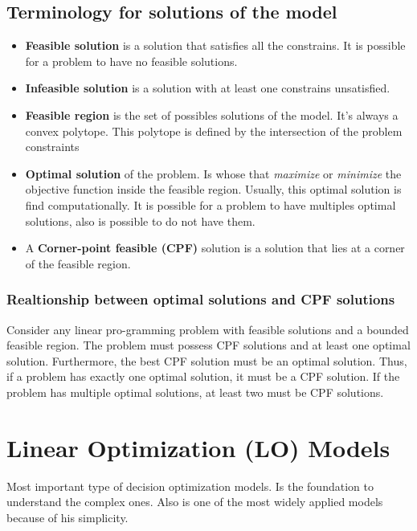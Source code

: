 \subsection{Terminology for solutions of the model}
\begin{itemize}
    \item \textbf{Feasible solution} is a solution that satisfies all the constrains. It is possible for a problem to have no feasible solutions.
    \item \textbf{Infeasible solution} is a solution with at least one constrains unsatisfied.
    \item \textbf{Feasible region} is the set of possibles solutions of the model. It's always a convex polytope. This polytope is defined by the intersection of the problem constraints
    \item \textbf{Optimal solution} of the problem. Is whose that \textit{maximize} or \textit{minimize} the objective function inside the feasible region. 
    Usually, this optimal solution is find computationally. It is possible for a problem to have multiples optimal solutions, also is possible to do not have them.
    \item A \textbf{Corner-point feasible (CPF)} solution is a solution that lies at a corner of the feasible region.
\end{itemize}

\subsubsection{Realtionship between optimal solutions and CPF solutions}
Consider any linear pro-gramming problem with feasible solutions and a bounded feasible region. The problem
must possess CPF solutions and at least one optimal solution. Furthermore, the best CPF
solution must be an optimal solution. Thus, if a problem has exactly one optimal solution,
it must be a CPF solution. If the problem has multiple optimal solutions, at least two must
be CPF solutions.


\section{Linear Optimization (LO) Models}
Most important type of decision optimization models. Is the foundation to understand the complex ones. Also is one of the most widely
applied models because of his simplicity.\\

